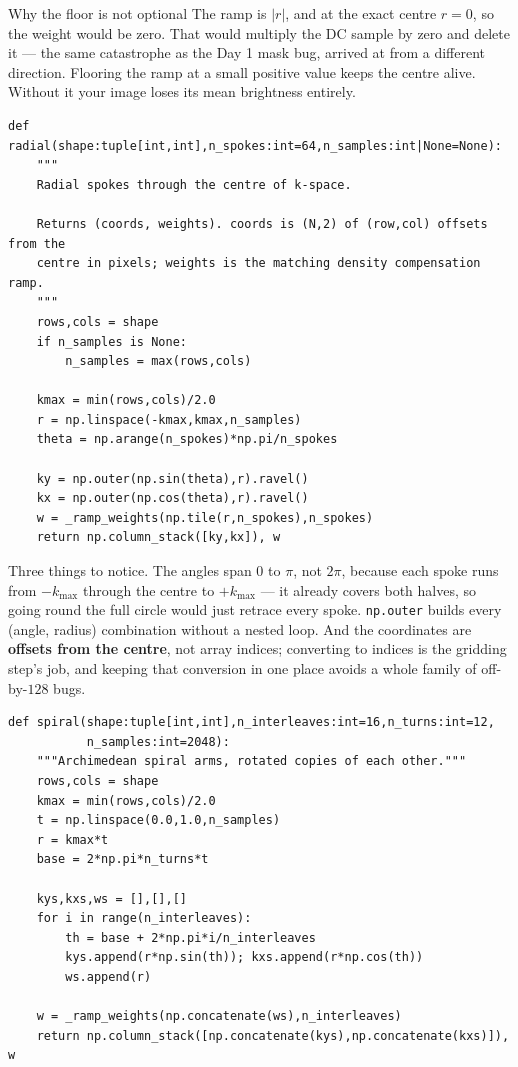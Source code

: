 \documentclass[11pt,a4paper]{article}
\begin{document}
\begin{notebox}{Why the floor is not optional}
The ramp is $|r|$, and at the exact centre $r=0$, so the weight would be zero.
That would multiply the DC sample by zero and delete it --- the same catastrophe
as the Day 1 mask bug, arrived at from a different direction. Flooring the ramp
at a small positive value keeps the centre alive. Without it your image loses its
mean brightness entirely.
\end{notebox}

\begin{lstlisting}
def radial(shape:tuple[int,int],n_spokes:int=64,n_samples:int|None=None):
    """
    Radial spokes through the centre of k-space.

    Returns (coords, weights). coords is (N,2) of (row,col) offsets from the
    centre in pixels; weights is the matching density compensation ramp.
    """
    rows,cols = shape
    if n_samples is None:
        n_samples = max(rows,cols)

    kmax = min(rows,cols)/2.0
    r = np.linspace(-kmax,kmax,n_samples)
    theta = np.arange(n_spokes)*np.pi/n_spokes

    ky = np.outer(np.sin(theta),r).ravel()
    kx = np.outer(np.cos(theta),r).ravel()
    w = _ramp_weights(np.tile(r,n_spokes),n_spokes)
    return np.column_stack([ky,kx]), w
\end{lstlisting}

Three things to notice. The angles span $0$ to $\pi$, not $2\pi$, because each
spoke runs from $-k_{\max}$ through the centre to $+k_{\max}$ --- it already
covers both halves, so going round the full circle would just retrace every
spoke. \texttt{np.outer} builds every (angle, radius) combination without a
nested loop. And the coordinates are \textbf{offsets from the centre}, not array
indices; converting to indices is the gridding step's job, and keeping that
conversion in one place avoids a whole family of off-by-$128$ bugs.

\begin{lstlisting}
def spiral(shape:tuple[int,int],n_interleaves:int=16,n_turns:int=12,
           n_samples:int=2048):
    """Archimedean spiral arms, rotated copies of each other."""
    rows,cols = shape
    kmax = min(rows,cols)/2.0
    t = np.linspace(0.0,1.0,n_samples)
    r = kmax*t
    base = 2*np.pi*n_turns*t

    kys,kxs,ws = [],[],[]
    for i in range(n_interleaves):
        th = base + 2*np.pi*i/n_interleaves
        kys.append(r*np.sin(th)); kxs.append(r*np.cos(th))
        ws.append(r)

    w = _ramp_weights(np.concatenate(ws),n_interleaves)
    return np.column_stack([np.concatenate(kys),np.concatenate(kxs)]), w
\end{lstlisting}
\end{document}
